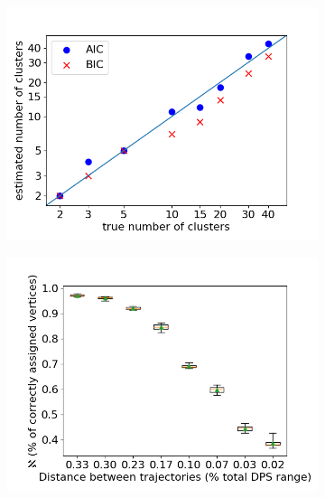 \begin{figure}
\begin{subfigure}[b]{0.32\textwidth}
\includegraphics[width=1\textwidth]{images/nrClust.png}
\caption{}
\label{diveResSynthC}
\end{subfigure}
\begin{subfigure}[b]{0.32\textwidth}
\includegraphics[width=1\textwidth]{images/correctVertices_trajCent.png}
\caption{}
\label{diveResSynthD}
\end{subfigure}
\begin{subfigure}[b]{0.32\textwidth}

\end{subfigure}
\end{figure}
